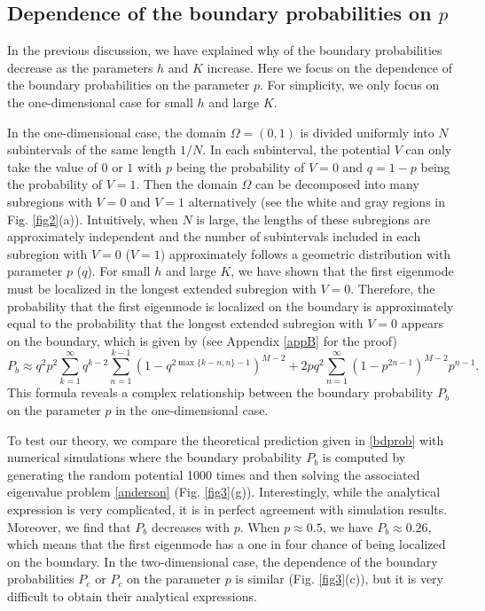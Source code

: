 \documentclass[a4paper,11pt]{article}
\begin{document}
\subsection{Dependence of the boundary probabilities on $p$}
In the previous discussion, we have explained why of the boundary probabilities decrease as the parameters $h$ and $K$ increase. Here we focus on the dependence of the boundary probabilities on the parameter $p$. For simplicity, we only focus on the one-dimensional case for small $h$ and large $K$.

In the one-dimensional case, the domain $\Omega = (0, 1)$ is divided uniformly into $N$ subintervals of the same length $1/N$. In each subinterval, the potential $V$ can only take the value of $0$ or $1$ with $p$ being the probability of $V = 0$ and $q = 1-p$ being the probability of $V = 1$. Then the domain $\Omega$ can be decomposed into many subregions with $V = 0$ and $V = 1$ alternatively (see the white and gray regions in Fig. \ref{fig2}(a)). Intuitively, when $N$ is large, the lengths of these subregions are approximately independent and the number of subintervals included in each subregion with $V = 0$ ($V = 1$) approximately follows a geometric distribution with parameter $p$ ($q$). For small $h$ and large $K$, we have shown that the first eigenmode must be localized in the longest extended subregion with $V = 0$. Therefore, the probability that the first eigenmode is localized on the boundary is approximately equal to the probability that the longest extended subregion with $V = 0$ appears on the boundary, which is given by (see Appendix \ref{appB} for the proof)
\begin{equation}\label{bdprob}
P_b \approx q^2 p^2 \sum_{k=1}^{\infty} q^{k-2} \sum_{n=1}^{k-1} (1 - q^{2 \max\{k-n,n\}-1})^{M-2} + 2p q^2 \sum_{n=1}^{\infty} (1 - p^{2 n-1})^{M-2} p^{n-1}.
\end{equation}
This formula reveals a complex relationship between the boundary probability $P_b$ on the parameter $p$ in the one-dimensional case.

To test our theory, we compare the theoretical prediction given in \eqref{bdprob} with numerical simulations where the boundary probability $P_b$ is computed by generating the random potential 1000 times and then solving the associated eigenvalue problem \eqref{anderson} (Fig. \ref{fig3}(g)). Interestingly, while the analytical expression is very complicated, it is in perfect agreement with simulation results. Moreover, we find that $P_b$ decreases with $p$. When $p\approx 0.5$, we have $P_b\approx 0.26$, which means that the first eigenmode has a one in four chance of being localized on the boundary. In the two-dimensional case, the dependence of the boundary probabilities $P_e$ or $P_c$ on the parameter $p$ is similar (Fig. \ref{fig3}(c)), but it is very difficult to obtain their analytical expressions.
\end{document}
